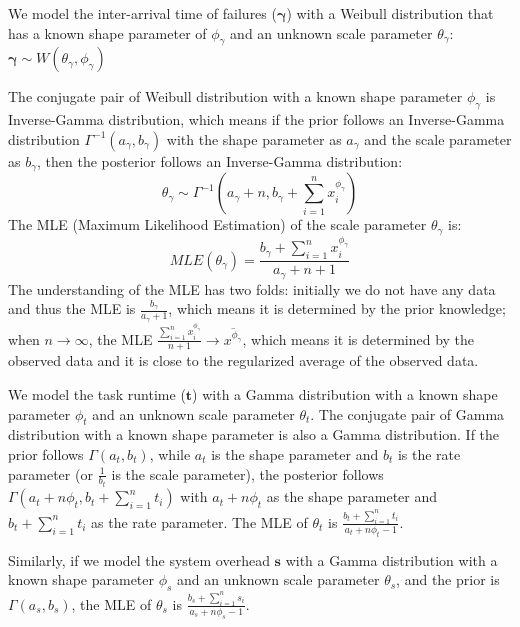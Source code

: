\documentclass{IOS-Book-Article}
\begin{document}
We model the inter-arrival time of failures ($\bm\gamma$) with a Weibull distribution that has a known shape parameter of $\phi_{\gamma}$ and an unknown scale parameter $\theta_{\gamma}$: $\bm\gamma\sim W(\theta_{\gamma}, \phi_{\gamma})$

The conjugate pair of Weibull distribution with a known shape parameter $\phi_{\gamma}$ is Inverse-Gamma distribution, which means if the prior follows an Inverse-Gamma distribution $\Gamma^{-1}(a_{\gamma}, b_{\gamma})$ with the shape parameter as $a_{\gamma}$ and the scale parameter as $b_{\gamma}$, then the posterior follows an Inverse-Gamma distribution:
\begin{equation}
\theta_{\gamma}\sim\Gamma^{-1}(a_{\gamma}+n,\displaystyle b_{\gamma}+\sum_{i=1}^n{x_i^{\phi_{\gamma}}})
\label{eq:theta-1}
 \end{equation}
The MLE (Maximum Likelihood Estimation) of the scale parameter $\theta_{\gamma}$ is:
\begin{equation}
MLE(\theta_{\gamma})=\displaystyle\frac{b_{\gamma}+\displaystyle\sum_{i=1}^n{x_i^{\phi_{\gamma}}}}{a_{\gamma}+n+1}
\end{equation}
The understanding of the MLE has two folds: initially we do not have any data and thus the MLE is $\displaystyle\frac{b_{\gamma}}{a_{\gamma}+1}$, which means it is determined by the prior knowledge; when $n\to\infty$, the MLE $\displaystyle\frac{\displaystyle\sum_{i=1}^n{x_i^{\phi_{\gamma}}}}{n+1}\to\overline{x^{\phi_{\gamma}}}$, which means it is determined by the observed data and it is close to the regularized average of the observed data. 

We model the task runtime ($\bm t$) with a Gamma distribution with a known shape parameter $\phi_{t}$ and an unknown scale parameter $\theta_t$. The conjugate pair of Gamma distribution with a known shape parameter is also a Gamma distribution. If the prior follows $\Gamma(a_t, b_t)$, while $a_t$ is the shape parameter and $b_t$ is the rate parameter (or $\displaystyle \frac{1}{b_t}$ is the scale parameter), the posterior follows $\Gamma(a_t+n\phi_t, b_t+\displaystyle\sum_{i=1}^n{t_i})$ with $a_t+n\phi_t$ as the shape parameter and $b_t+\displaystyle\sum_{i=1}^n{t_i}$ as the rate parameter. The MLE of $\theta_t$ is $\displaystyle\frac{b_t+\displaystyle\sum_{i=1}^n{t_i}}{a_t+n\phi_t-1}$. 

Similarly, if we model the system overhead $\bm s$ with a Gamma distribution with a known shape parameter $\phi_{s}$ and an unknown scale parameter $\theta_s$, and the prior is $\Gamma(a_s, b_s)$, the MLE of $\theta_s$ is $\displaystyle\frac{b_s+\displaystyle\sum_{i=1}^n{s_i}}{a_s+n\phi_s-1}$.
\end{document}
